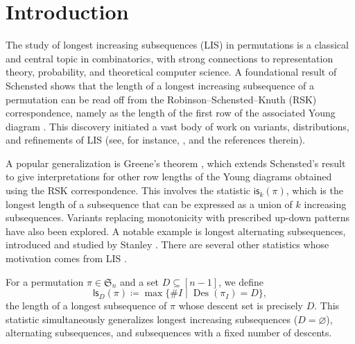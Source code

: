 \documentclass[12pt]{article}
\newcommand{\is}{\mathsf{is}}
\newcommand{\ls}{\mathsf{ls}}
\newcommand{\Des}{\operatorname{Des}}
\newcommand{\s}{\mathfrak{S}}
\theoremstyle{definition}
\begin{document}





\section{Introduction}
The study of longest increasing subsequences (LIS) in permutations is a classical and central topic in combinatorics, with strong connections to representation theory, probability, and theoretical computer science. 
A foundational result of Schensted shows that the length of a longest increasing subsequence of a permutation can be read off from the Robinson--Schensted--Knuth (RSK) correspondence, namely as the length of the first row of the associated Young diagram \cite{schensted}. 
This discovery initiated a vast body of work on variants, distributions, and refinements of LIS (see, for instance, \cite{lisbook,stanley2007increasing}, and the references therein).

A popular generalization is Greene's theorem \cite{greene}, which extends Schensted's result to give interpretations for other row lengths of the Young diagrams obtained using the RSK correspondence. 
This involves the statistic $\is_k(\pi)$, which is the longest length of a subsequence that can be expressed as a union of $k$ increasing subsequences. 
Variants replacing monotonicity with prescribed up-down patterns have also been explored. 
A notable example is longest alternating subsequences, introduced and studied by Stanley \cite{stan_as}. 
There are several other statistics whose motivation comes from LIS \cite{wave,almostinc,common}.

For a permutation $\pi \in \s_n$ and a set $D \subseteq [n - 1]$, we define
\begin{equation*}
        \ls_D(\pi) \coloneqq \max \{\#I \mid \Des(\pi_I) = D\},
\end{equation*}
the length of a longest subsequence of $\pi$ whose descent set is precisely $D$. 
This statistic simultaneously generalizes longest increasing subsequences ($D=\varnothing$), alternating subsequences, and subsequences with a fixed number of descents.
\end{document}
